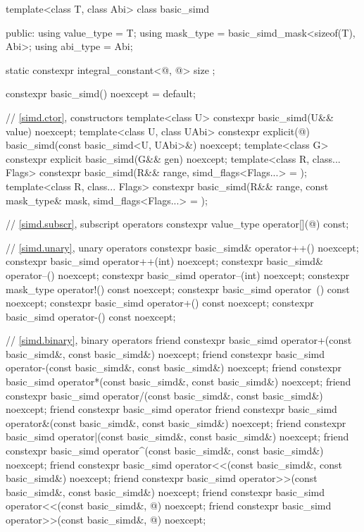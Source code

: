 \begin{codeblock}
template<class T, class Abi> class basic_simd {
public:
  using value_type = T;
  using mask_type = basic_simd_mask<sizeof(T), Abi>;
  using abi_type = Abi;

  static constexpr integral_constant<@\simdsizetype@, @> size {};

  constexpr basic_simd() noexcept = default;

  // \ref{simd.ctor},  constructors
  template<class U> constexpr basic_simd(U&& value) noexcept;
  template<class U, class UAbi>
    constexpr explicit(@\seebelow@) basic_simd(const basic_simd<U, UAbi>&) noexcept;
  template<class G> constexpr explicit basic_simd(G&& gen) noexcept;
  template<class R, class... Flags>
    constexpr basic_simd(R&& range, simd_flags<Flags...> = {});
  template<class R, class... Flags>
    constexpr basic_simd(R&& range, const mask_type& mask, simd_flags<Flags...> = {});

  // \ref{simd.subscr},  subscript operators
  constexpr value_type operator[](@\simdsizetype@) const;

  // \ref{simd.unary},  unary operators
  constexpr basic_simd& operator++() noexcept;
  constexpr basic_simd operator++(int) noexcept;
  constexpr basic_simd& operator--() noexcept;
  constexpr basic_simd operator--(int) noexcept;
  constexpr mask_type operator!() const noexcept;
  constexpr basic_simd operator~() const noexcept;
  constexpr basic_simd operator+() const noexcept;
  constexpr basic_simd operator-() const noexcept;

  // \ref{simd.binary},  binary operators
  friend constexpr basic_simd operator+(const basic_simd&, const basic_simd&) noexcept;
  friend constexpr basic_simd operator-(const basic_simd&, const basic_simd&) noexcept;
  friend constexpr basic_simd operator*(const basic_simd&, const basic_simd&) noexcept;
  friend constexpr basic_simd operator/(const basic_simd&, const basic_simd&) noexcept;
  friend constexpr basic_simd operator%
  friend constexpr basic_simd operator&(const basic_simd&, const basic_simd&) noexcept;
  friend constexpr basic_simd operator|(const basic_simd&, const basic_simd&) noexcept;
  friend constexpr basic_simd operator^(const basic_simd&, const basic_simd&) noexcept;
  friend constexpr basic_simd operator<<(const basic_simd&, const basic_simd&) noexcept;
  friend constexpr basic_simd operator>>(const basic_simd&, const basic_simd&) noexcept;
  friend constexpr basic_simd operator<<(const basic_simd&, @\simdsizetype@) noexcept;
  friend constexpr basic_simd operator>>(const basic_simd&, @\simdsizetype@) noexcept;

}
\end{codeblock}
